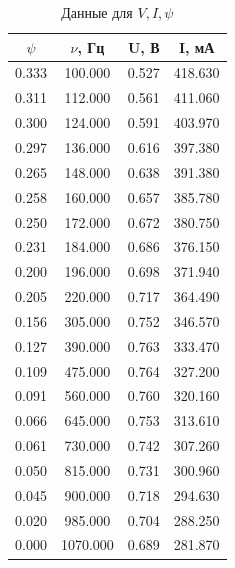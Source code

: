 \documentclass[a4paper, 12pt]{article}
\begin{document}
\begin{table}[H]
	\centering
	\begin{tabular}{|c|c|c|c|}
	\hline
	$\psi$ & $\nu$, Гц & U, В  & I, мА   \\ \hline
	0.333  & 100.000   & 0.527 & 418.630 \\ \hline
	0.311  & 112.000   & 0.561 & 411.060 \\ \hline
	0.300  & 124.000   & 0.591 & 403.970 \\ \hline
	0.297  & 136.000   & 0.616 & 397.380 \\ \hline
	0.265  & 148.000   & 0.638 & 391.380 \\ \hline
	0.258  & 160.000   & 0.657 & 385.780 \\ \hline
	0.250  & 172.000   & 0.672 & 380.750 \\ \hline
	0.231  & 184.000   & 0.686 & 376.150 \\ \hline
	0.200  & 196.000   & 0.698 & 371.940 \\ \hline
	0.205  & 220.000   & 0.717 & 364.490 \\ \hline
	0.156  & 305.000   & 0.752 & 346.570 \\ \hline
	0.127  & 390.000   & 0.763 & 333.470 \\ \hline
	0.109  & 475.000   & 0.764 & 327.200 \\ \hline
	0.091  & 560.000   & 0.760 & 320.160 \\ \hline
	0.066  & 645.000   & 0.753 & 313.610 \\ \hline
	0.061  & 730.000   & 0.742 & 307.260 \\ \hline
	0.050  & 815.000   & 0.731 & 300.960 \\ \hline
	0.045  & 900.000   & 0.718 & 294.630 \\ \hline
	0.020  & 985.000   & 0.704 & 288.250 \\ \hline
	0.000  & 1070.000  & 0.689 & 281.870 \\ \hline
	\end{tabular}
	\caption{Данные для $V, I, \psi$}
	\label{tab:2}
	\end{table}
\end{document}
